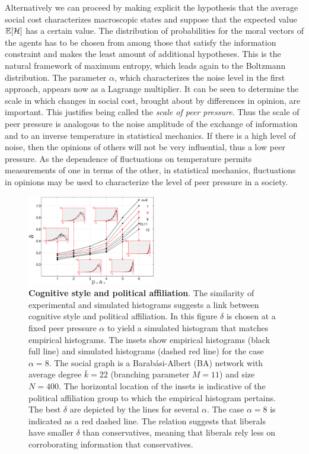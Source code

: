 \documentclass[twocolumn,showpacs]{revtex4-1}
\begin{document}
Alternatively we can proceed by making  explicit the
hypothesis
that the average social cost characterizes 
macroscopic states and suppose
that the expected value $\mathbb{E}[{\cal H}]$ has a certain value.  
The distribution of probabilities for 
the moral vectors of the agents has to be 
chosen  from among those that satisfy the information 
constraint and makes the least amount of 
additional hypotheses. This is the natural framework 
of maximum entropy, which leads again to the Boltzmann 
distribution. 
The  parameter $\alpha$, which characterizes the noise level in the 
first approach, appears now as a Lagrange multiplier. It
can be  seen to determine
the scale in which changes in social cost, 
brought about by differences in opinion, are important. 
This justifies being called the { \it scale of peer pressure}.
Thus the scale of peer pressure is analogous to the noise
amplitude of the exchange of information and to an inverse temperature
in statistical mechanics. If there is a high level of noise, then
the opinions of others will not be very influential, thus a low peer 
pressure. As the dependence of fluctuations on temperature permits
measurements of one in terms of the other, in statistical mechanics, 
fluctuations in opinions may be used to characterize the level 
of peer pressure in a society.


\begin{figure}[!ht]
\includegraphics[width=0.5\textwidth]{fig4_cognitive_style.eps}
\caption{{\bf Cognitive style and political affiliation}. The similarity of experimental and simulated  histograms 
suggests a link between cognitive style and political affiliation. In this figure $\delta$ is chosen at a fixed peer 
pressure $\alpha$ to yield a simulated histogram that matches empirical histograms. The insets show empirical histograms 
(black full line) and simulated histograms (dashed red line) for the case $\alpha=8$. The social graph is a Barab\'asi-Albert (BA) network \cite{barabasireview} with average degree $\bar{k}=22$ (branching parameter $M=11$) and size $N=400$. The horizontal  location of the insets
 is indicative of the political affiliation group to which the empirical histogram pertains. The best $\delta$ are depicted by the lines for several $\alpha$. The case $\alpha=8$ is indicated as a red dashed line.  The relation suggests that
 liberals have smaller $\delta$ than conservatives, meaning that liberals rely less on corroborating information that conservatives.  
 }\label{fig:delta_pa}
\end{figure}
\end{document}
